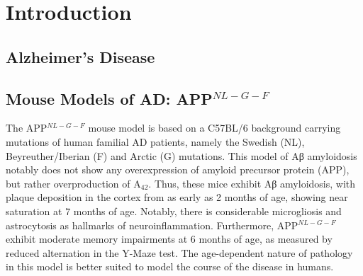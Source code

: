 \chapter{\label{ch:1-intro}Introduction} 

\minitoc

\section{Alzheimer's Disease}
\section{Mouse Models of AD: APP$^{NL-G-F}$}
The APP$^{NL-G-F}$ mouse model is based on a C57BL/6 background carrying mutations of human familial AD patients, namely the Swedish (NL), Beyreuther/Iberian (F) and Arctic (G) mutations.
This model of Aβ amyloidosis notably does not show any overexpression of amyloid precursor protein (APP), but rather overproduction of A\textbeta$_{42}$. Thus, these mice exhibit Aβ amyloidosis, with plaque deposition in the cortex from as early as 2 months of age, showing near saturation at 7 months of age. Notably, there is considerable microgliosis and astrocytosis as hallmarks of neuroinflammation. Furthermore,  APP$^{NL-G-F}$ exhibit moderate memory impairments at 6 months of age, as measured by reduced alternation in the Y-Maze test. The age-dependent nature of pathology in this model is better suited to model the course of the disease in humans. \citep{Saito2014}
